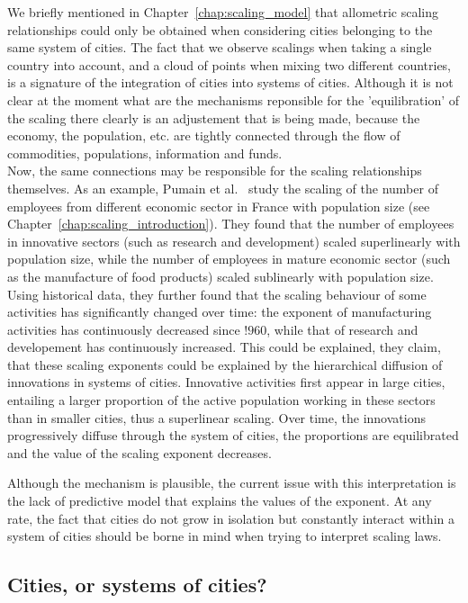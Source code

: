 We briefly mentioned in Chapter~\ref{chap:scaling_model} that allometric scaling relationships
could only be obtained when considering cities belonging to the same system of
cities. The fact that we observe scalings when taking a single country into
account, and a cloud of points when mixing two different countries, is a
signature of the integration of cities into systems of cities. Although it is
not clear at the moment what are the mechanisms reponsible for the
'equilibration' of the scaling there clearly is an adjustement that is being
made, because the economy, the population, etc. are tightly connected through
the flow of commodities, populations, information and funds.\\

Now, the same connections may be responsible for the scaling relationships
themselves. As an example, Pumain et al.~\cite{Pumain:2006} study the scaling of
the number of employees from different economic sector in France with population size (see
Chapter~\ref{chap:scaling_introduction}). They found that the number of
employees in innovative sectors (such as research and development) scaled
superlinearly with population size, while the number of employees in mature
economic sector (such as the manufacture of food products) scaled sublinearly
with population size. Using historical data, they further found that the
scaling behaviour of some activities has significantly changed over time: the
exponent of manufacturing activities has continuously decreased since $!960$,
while that of research and developement has continuously increased. This could
be explained, they claim, that these scaling exponents could be explained by the
hierarchical diffusion of innovations in systems of cities. Innovative
activities first appear in large cities, entailing a larger proportion of the
active population working in these sectors than in smaller cities, thus a
superlinear scaling. Over time, the innovations progressively diffuse through
the system of cities, the proportions are equilibrated and the value of the
scaling exponent decreases.

Although the mechanism is plausible, the current issue with this interpretation
is the lack of predictive model that explains the values of the exponent. At any
rate, the fact that cities do not grow in isolation but constantly interact
within a system of cities should be borne in mind when trying to interpret
scaling laws.

\subsection{Cities, or systems of cities?}
\label{sub:cities_or_systems_of_cities_}

